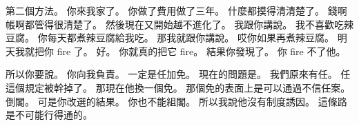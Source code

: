 \hypertarget{w01:cue:2519}{}第二個方法。
\hypertarget{w01:cue:2520}{}你來我家了。
\hypertarget{w01:cue:2521}{}你做了費用做了三年。
\hypertarget{w01:cue:2522}{}什麼都摸得清清楚了。
\hypertarget{w01:cue:2523}{}錢啊帳啊都管得很清楚了。
\hypertarget{w01:cue:2524}{}然後現在又開始越不進化了。
\hypertarget{w01:cue:2525}{}我跟你講說。
\hypertarget{w01:cue:2526}{}我不喜歡吃辣豆腐。
\hypertarget{w01:cue:2527}{}你每天都煮辣豆腐給我吃。
\hypertarget{w01:cue:2528}{}那我就跟你講說。
\hypertarget{w01:cue:2529}{}哎你如果再煮辣豆腐。
\hypertarget{w01:cue:2530}{}明天我就把你 fire 了。
\hypertarget{w01:cue:2531}{}好。
\hypertarget{w01:cue:2532}{}你就真的把它 fire。
\hypertarget{w01:cue:2533}{}結果你發現了。
\hypertarget{w01:cue:2534}{}你 fire 不了他。

\hypertarget{w01:cue:2535}{}所以你要說。
\hypertarget{w01:cue:2536}{}你向我負責。
\hypertarget{w01:cue:2537}{}一定是任加免。
\hypertarget{w01:cue:2538}{}現在的問題是。
\hypertarget{w01:cue:2539}{}我們原來有任。
\hypertarget{w01:cue:2540}{}任這個規定被幹掉了。
\hypertarget{w01:cue:2541}{}那現在他換一個免。
\hypertarget{w01:cue:2542}{}那個免的表面上是可以通過不信任案。
\hypertarget{w01:cue:2543}{}倒閣。
\hypertarget{w01:cue:2544}{}可是你改選的結果。
\hypertarget{w01:cue:2545}{}你也不能組閣。
\hypertarget{w01:cue:2546}{}所以我說他沒有制度誘因。
\hypertarget{w01:cue:2547}{}這條路是不可能行得通的。

